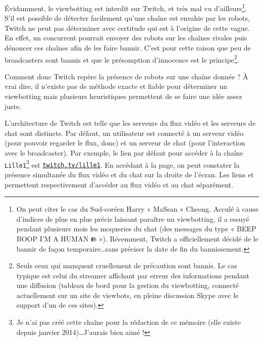 \documentclass[a4paper]{article}
\begin{document}
Évidamment, le viewbotting est interdit sur Twitch, et très mal vu d'ailleurs\footnote{On peut citer le cas du Sud-coréen Harry « MaSsan » Cheong. Acculé à cause d'indices de plus en plus précis laissant paraître un viewbotting, il a essuyé pendant plusieurs mois les moqueries du chat (des messages du type « BEEP BOOP I'M A HUMAN \includegraphics[width=0.3cm]{MrDestructoid.png} »). Récemment, Twitch a officiellement décidé de le bannir de façon temporaire\ldots sans préciser la date de fin du bannissement.}. S'il est possible de détecter facilement qu'une chaîne est envahie par les robots, Twitch ne peut pas déterminer avec certitude qui est à l'origine de cette vague. En effet, un concurrent pourrait envoyer des robots sur les chaînes rivales puis dénoncer ces chaînes afin de les faire bannir. C'est pour cette raison que peu de broadcasters sont bannis et que le présomption d'innocence est le principe\footnote{Seuls ceux qui manquent cruellement de précaution sont bannis. Le cas typique est celui du streamer affichant par erreur des informations pendant une diffusion (tableau de bord pour la gestion du viewbotting, connecté actuellement sur un site de viewbots, en pleine discussion Skype avec le support d'un de ces sites).}. 

Comment donc Twitch repère la présence de robots sur une chaîne donnée ? À vrai dire, il n'existe pas de méthode exacte et fiable pour déterminer un viewbotting mais plusieurs heuristiques permettent de se faire une idée assez juste. 

L'architecture de Twitch est telle que les serveurs du flux vidéo et les serveurs de chat sont distincts. Par défaut, un utilisateur est connecté à un serveur vidéo (pour pouvoir regarder le flux, donc) et un serveur de chat (pour l'interaction avec le broadcaster). Par exemple, le lien par défaut pour accéder à la chaîne \verb|Lille1|\footnote{Je n'ai pas créé cette chaîne pour la rédaction de ce mémoire (elle existe depuis janvier 2014)\ldots J'aurais bien aimé !} est \href{https://www.twitch.tv/lille1}{\texttt{twitch.tv/lille1}}. En accédant à la page, on peut constater la présence simultanée du flux vidéo et du chat sur la droite de l'écran. Les liens  et  permettent respectivement d'accéder au flux vidéo et au chat séparément.
\end{document}
